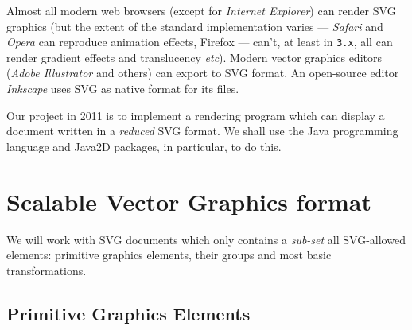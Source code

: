 \documentclass[a4paper]{article}
\begin{document}
Almost all modern web browsers (except for \emph{Internet Explorer}) can render SVG graphics
(but the extent of the standard implementation varies --- \emph{Safari} and \emph{Opera} can reproduce
animation effects, Firefox --- can't, at least in \texttt{3.x}, all can render gradient effects
and translucency \emph{etc}). Modern vector graphics editors (\emph{Adobe Illustrator} and others) 
can export to SVG format. An open-source editor \emph{Inkscape} uses SVG as native format for its files.

Our project in 2011 is to implement a rendering program which can display a document written in a
\emph{reduced} SVG format. We shall use the Java programming language and Java2D packages, 
in particular, to do this.

\section*{Scalable Vector Graphics format} %
\label{sec:scalable_vector_graphics_format}

We will work with SVG documents which only contains a \emph{sub-set} all SVG-allowed elements:
primitive graphics elements, their groups and most basic transformations. 

\subsection*{Primitive Graphics Elements} %
\label{sub:primitive_graphics_elements}
\end{document}
